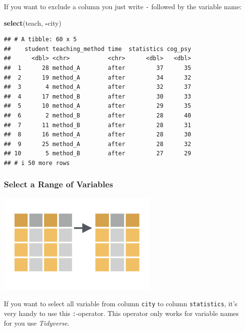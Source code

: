\documentclass[
]{scrartcl}
\newenvironment{Shaded}{\begin{snugshade}}{\end{snugshade}}
\newcommand{\FunctionTok}[1]{\textcolor[rgb]{0.13,0.29,0.53}{\textbf{#1}}}
\newcommand{\NormalTok}[1]{#1}
\newcommand{\SpecialCharTok}[1]{\textcolor[rgb]{0.81,0.36,0.00}{\textbf{#1}}}
\begin{document}
If you want to exclude a column you just write \texttt{-} followed by the variable name:

\begin{Shaded}
\begin{Highlighting}[]
\FunctionTok{select}\NormalTok{(teach, }\SpecialCharTok{{-}}\NormalTok{city)}
\end{Highlighting}
\end{Shaded}

\begin{verbatim}
## # A tibble: 60 x 5
##    student teaching_method time  statistics cog_psy
##      <dbl> <chr>           <chr>      <dbl>   <dbl>
##  1      28 method_A        after         37      35
##  2      19 method_A        after         34      32
##  3       4 method_A        after         32      37
##  4      17 method_B        after         30      33
##  5      10 method_A        after         29      35
##  6       2 method_B        after         28      40
##  7      11 method_B        after         28      31
##  8      16 method_A        after         28      30
##  9      25 method_A        after         28      32
## 10       5 method_B        after         27      29
## # i 50 more rows
\end{verbatim}

\hypertarget{select-a-range-of-variables}{%
\subsubsection{Select a Range of Variables}\label{select-a-range-of-variables}}

\begin{center}\includegraphics[width=300px]{images/dplyr-select-range} \end{center}

If you want to select all variable from column \texttt{city} to column \texttt{statistics}, it's very handy to use this \texttt{:}-operator. This operator only works for variable names for you use \emph{Tidyverse}.
\end{document}
